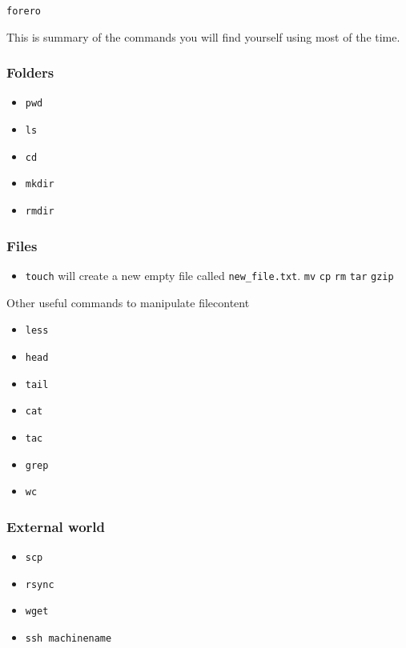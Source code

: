 \documentclass{article}
\begin{document}
\begin{verbatim}
forero
\end{verbatim}


This is summary of the commands you will find yourself using most of the time.

\subsubsection*{Folders}
\begin{itemize}
\item\verb"pwd"
\item\verb"ls"
\item\verb"cd"
\item\verb"mkdir"
\item\verb"rmdir"
\end{itemize}


\subsubsection*{Files}
\begin{itemize}
\item 
\verb"touch" will create a new empty file called \verb"new_file.txt".
\verb"mv"
\verb"cp"
\verb"rm"
\verb"tar"
\verb"gzip"
\end{itemize}


Other useful commands to manipulate filecontent
\begin{itemize}
\item\verb"less"
\item\verb"head"
\item\verb"tail"
\item\verb"cat"
\item\verb"tac"
\item\verb"grep"
\item\verb"wc"
\end{itemize}


\subsubsection*{External world}


\begin{itemize}
\item\verb"scp"
\item\verb"rsync"
\item\verb"wget"
\item\verb"ssh machinename"
\end{itemize}
\end{document}

